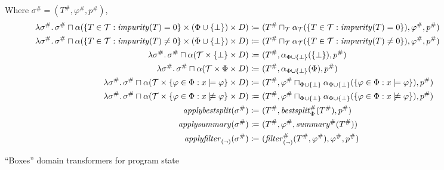 \begin{figure}
\centering
Where $\sigma^\# = (T^\#, \varphi^\#, p^\#)$,
\begin{align*}
\lambda \sigma^\# \ldotp \sigma^\# \sqcap
\alpha(\{T \in \mathcal{T} : \mathit{impurity}(T) = 0\} \times (\Phi \cup \{\bot\}) \times D)
\coloneqq&~
(T^\# \sqcap_\mathcal{T} \alpha_\mathcal{T}(\{T \in \mathcal{T} : \mathit{impurity}(T) = 0\}),
\varphi^\#, p^\#) \\
%
\lambda \sigma^\# \ldotp \sigma^\# \sqcap
\alpha(\{T \in \mathcal{T} : \mathit{impurity}(T) \neq 0\} \times (\Phi \cup \{\bot\}) \times D)
\coloneqq&~
(T^\# \sqcap_\mathcal{T} \alpha_\mathcal{T}(\{T \in \mathcal{T} : \mathit{impurity}(T) \neq 0\}),
\varphi^\#, p^\#) \\
%
\lambda \sigma^\# \ldotp \sigma^\# \sqcap
\alpha(\mathcal{T} \times \{\bot\} \times D)
\coloneqq&~
(T^\#, \alpha_{\Phi\cup\{\bot\}}(\{\bot\}), p^\#) \\
%
\lambda \sigma^\# \ldotp \sigma^\# \sqcap
\alpha(\mathcal{T} \times \Phi \times D)
\coloneqq&~
(T^\#, \alpha_{\Phi\cup\{\bot\}}(\Phi), p^\#) \\
%
\lambda \sigma^\# \ldotp \sigma^\# \sqcap
\alpha(\mathcal{T} \times \{\varphi \in \Phi : x \models \varphi\} \times D)
\coloneqq&~
(T^\#, \varphi^\# \sqcap_{\Phi\cup\{\bot\}}
\alpha_{\Phi\cup\{\bot\}}(\{\varphi \in \Phi : x \models \varphi\}), p^\#) \\
%
\lambda \sigma^\# \ldotp \sigma^\# \sqcap
\alpha(\mathcal{T} \times \{\varphi \in \Phi : x \not\models \varphi\} \times D)
\coloneqq&~
(T^\#, \varphi^\# \sqcap_{\Phi\cup\{\bot\}}
\alpha_{\Phi\cup\{\bot\}}(\{\varphi \in \Phi : x \not\models \varphi\}), p^\#) \\
%
\mathit{applybestsplit}(\sigma^\#)
\coloneqq&~
(T^\#, \mathit{bestsplit}^\#_\Phi(T^\#), p^\#) \\
%
\mathit{applysummary}(\sigma^\#)
\coloneqq&~
(T^\#, \varphi^\#, \mathit{summary}^\#(T^\#)) \\
%
\mathit{applyfilter}_{(\lnot)}(\sigma^\#)
\coloneqq&~
(\mathit{filter}^\#_{(\lnot)}(T^\#, \varphi^\#), \varphi^\#, p^\#) \\
\end{align*}
\caption{``Boxes'' domain transformers for program state}
\label{fig:boxes}
\end{figure}

